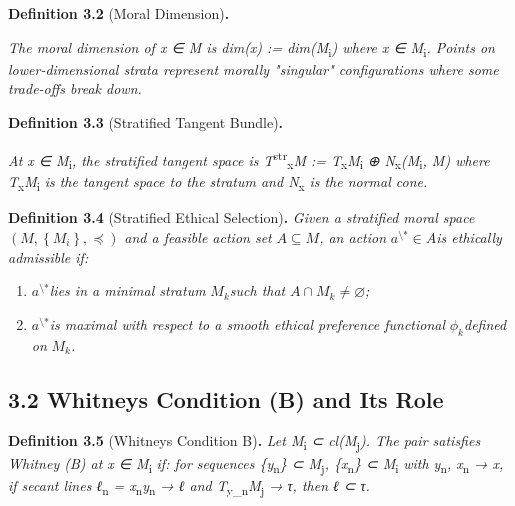 \documentclass[12pt]{article}
\theoremstyle{plain}
\theoremstyle{definition}
\theoremstyle{remark}
\begin{document}
\textbf{Definition 3.2} (Moral Dimension)\textbf{.}

\emph{The moral dimension of x ∈ M is dim(x) :=
dim(M}\textsubscript{i}\emph{) where x ∈ M}\textsubscript{i}\emph{.
Points on lower-dimensional strata represent morally "singular"
configurations where some trade-offs break down.}

\textbf{Definition 3.3} (Stratified Tangent Bundle)\textbf{.}

\emph{At x ∈ M}\textsubscript{i}\emph{, the stratified tangent space is
T}\textsuperscript{str}\textsubscript{x}\emph{M :=
T}\textsubscript{x}\emph{M}\textsubscript{i} \emph{⊕
N}\textsubscript{x}\emph{(M}\textsubscript{i}\emph{, M) where
T}\textsubscript{x}\emph{M}\textsubscript{i} \emph{is the tangent space
to the stratum and N}\textsubscript{x} \emph{is the normal cone.}

\textbf{Definition 3.4} (Stratified Ethical Selection)\textbf{.}
\emph{Given a stratified moral space}
\(\left( M,\left\{ M_{i} \right\}, \preceq \right)\) \emph{and a
feasible action set} \(A \subseteq M\)\emph{, an action}
\(a^{\text{\textbackslash*}} \in A\)\emph{is ethically admissible if:}

\begin{enumerate}
\item
  \(a^{\text{\textbackslash*}}\)\emph{lies in a minimal stratum}
  \(M_{k}\)\emph{such that} \(A \cap M_{k} \neq \varnothing\)\emph{;}
\item
  \(a^{\text{\textbackslash*}}\)\emph{is maximal with respect to a
  smooth ethical preference functional} \(\phi_{k}\)\emph{defined on}
  \(M_{k}\)\emph{.}
\end{enumerate}

\subsection{3.2 Whitney\textquotesingle s Condition (B) and Its
Role}\label{whitneys-condition-b-and-its-role}

\textbf{Definition 3.5} (Whitney\textquotesingle s Condition
B)\textbf{.} \emph{Let M}\textsubscript{i} \emph{⊂
cl(M}\textsubscript{j}\emph{). The pair satisfies Whitney (B) at x ∈
M}\textsubscript{i} \emph{if: for sequences
\{y}\textsubscript{n}\emph{\} ⊂ M}\textsubscript{j}\emph{,
\{x}\textsubscript{n}\emph{\} ⊂ M}\textsubscript{i} \emph{with
y}\textsubscript{n}\emph{, x}\textsubscript{n} \emph{→ x, if secant
lines ℓ}\textsubscript{n} \emph{=
x}\textsubscript{n}\emph{y}\textsubscript{n} \emph{→ ℓ and
T}\textsubscript{y\_n}\emph{M}\textsubscript{j} \emph{→ τ, then ℓ ⊂ τ.}
\end{document}
